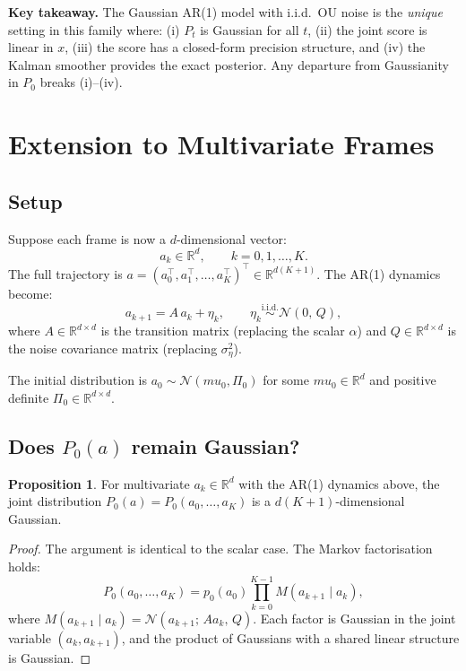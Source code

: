 \documentclass[12pt, a4paper]{article}
\def\ba{a}%
\def\bx{x}%
\def\bmu{mu}%
\def\bm#1{#1}%
\theoremstyle{definition}
\newtheorem{proposition}{Proposition}[section]
\newcommand{\R}{\mathbb{R}}
\newcommand{\N}{\mathcal{N}}
\newcommand{\ba}{\bm{a}}
\newcommand{\bx}{\bm{x}}
\newcommand{\bmu}{\bm{\mu}}
\begin{document}
\begin{resultbox}
\textbf{Key takeaway.} The Gaussian AR(1) model with i.i.d.\ OU noise is
the \emph{unique} setting in this family where: (i) $P_t$ is Gaussian
for all $t$, (ii) the joint score is linear in $\bx$, (iii) the score
has a closed-form precision structure, and (iv) the Kalman smoother
provides the exact posterior. Any departure from Gaussianity in $P_0$
breaks (i)--(iv).
\end{resultbox}

\section{Extension to Multivariate Frames}
\label{sec:multivariate}

\subsection{Setup}

Suppose each frame is now a $d$-dimensional vector:
\[
  \ba_k \in \R^d, \qquad k = 0, 1, \ldots, K.
\]
The full trajectory is $\ba = (\ba_0^\top, \ba_1^\top, \ldots,
\ba_K^\top)^\top \in \R^{d(K+1)}$. The AR(1) dynamics become:
\[
  \ba_{k+1} = A\,\ba_k + \bm{\eta}_k,
  \qquad
  \bm{\eta}_k \overset{\mathrm{i.i.d.}}{\sim} \N(\bm{0},\, Q),
\]
where $A \in \R^{d\times d}$ is the transition matrix (replacing the
scalar $\alpha$) and $Q \in \R^{d\times d}$ is the noise covariance
matrix (replacing $\sigma_\eta^2$).

The initial distribution is $\ba_0 \sim \N(\bmu_0, \Pi_0)$ for some
$\bmu_0\in\R^d$ and positive definite $\Pi_0\in\R^{d\times d}$.

\subsection{Does \texorpdfstring{$P_0(\ba)$}{P0(a)} remain Gaussian?}

\begin{proposition}
For multivariate $\ba_k \in \R^d$ with the AR(1) dynamics above, the
joint distribution $P_0(\ba) = P_0(\ba_0, \ldots, \ba_K)$ is a
$d(K+1)$-dimensional Gaussian.
\end{proposition}

\begin{proof}
The argument is identical to the scalar case. The Markov factorisation
holds:
\[
  P_0(\ba_0,\ldots,\ba_K)
  = p_0(\ba_0)\prod_{k=0}^{K-1} M(\ba_{k+1}\mid\ba_k),
\]
where $M(\ba_{k+1}\mid\ba_k) = \N(\ba_{k+1};\,A\ba_k,\,Q)$.
Each factor is Gaussian in the joint variable $(\ba_k,\ba_{k+1})$,
and the product of Gaussians with a shared linear structure is Gaussian.
\end{proof}
\end{document}
